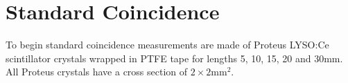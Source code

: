 \section{Standard Coincidence}
To begin standard coincidence measurements are made of Proteus LYSO:Ce scintillator crystals wrapped in PTFE tape for lengths 5, 10, 15, 20 and 30mm. All Proteus crystals have a cross section of $2\times2$mm$^2$.